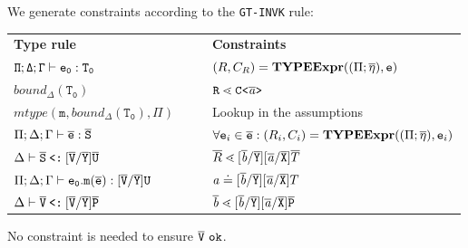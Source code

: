 \begin{description}
We generate constraints according to the \texttt{GT-INVK} rule:\\
\begin{small}
\begin{tabularx}{\linewidth}{lX|Xl}
  \textbf{\TFGJ{} Type rule} &&& \textbf{Constraints} \\
  $\mathtt{\Pi;\Delta;\Gamma \vdash e_0 : T_0 }$ &&&
    $({R}, C_R) = \textbf{TYPEExpr}(({\Pi} ;\overline{\mathtt{\eta}}), \texttt{e})$\\ 
  $\mathtt{\mathit{bound}_\Delta (T_0)}$ &&& $\texttt{R} \lessdot \mathtt{C \texttt{<} \overline{\tt \mathit{ a }} \texttt{>} }$ \\
  $\mathtt{\mathit{mtype}(m, \mathit{bound}_\Delta (T_0), \Pi)}$ &&& Lookup in the assumptions \\
 $\Pi;\Delta;\Gamma \vdash \overline{\tt e} : \overline{\tt S}$ &&& $\forall \texttt{e}_i \in \overline{\tt e} : (R_i, C_i) = \textbf{TYPEExpr}(({\Pi} ;
 \overline{\mathtt{\eta}}), \texttt{e}_i)$\\
 $\Delta \vdash \overline{\tt S} \mathbin{\texttt{<:}}  [\overline{\tt V}/\overline{\tt Y}]\overline{\tt U}$ &&& $ \overline{R} \lessdot [\overline{\tt \mathit{ b }}/\overline{\tt Y}][\overline{\tt \mathit{ a }}/\overline{\tt X}]\overline{T}$\\
 $\Pi;\Delta;\Gamma \vdash \mathtt{e_0.m(\overline{e}) : [\overline{\tt V}/\overline{\tt Y}]U }$ &&& $ \mathit{ a } \doteq [\overline{\tt \mathit{ b }}/\overline{\tt Y}][\overline{\tt \mathit{ a }}/\overline{\tt X}]{T}$ \\
 $\Delta \vdash \overline{\tt V} \mathbin{\texttt{<:}}  [\overline{\tt V}/\overline{\tt Y}]\overline{\tt P}$ &&& $\overline{\tt \mathit{ b }} \lessdot [\overline{\tt \mathit{ b }}/\overline{\tt Y}][\overline{\tt \mathit{ a }}/\overline{\tt X}]\overline{\tt P}$ \\
\end{tabularx}
\end{small}

No constraint is needed to ensure $\ol{V}\ \texttt{ok}$.


\end{description}
